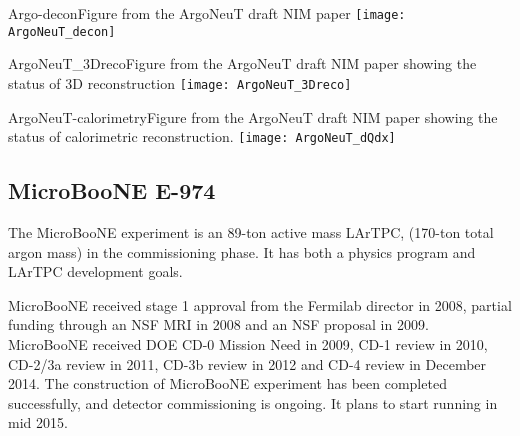\begin{cdrfigure}{Argo-decon}{Figure from the ArgoNeuT draft NIM paper}
\texttt{[image: ArgoNeuT\_decon]}
\end{cdrfigure} %

\begin{cdrfigure}{ArgoNeuT_3Dreco}{Figure from the ArgoNeuT draft NIM paper showing the status of 3D reconstruction}
\texttt{[image: ArgoNeuT\_3Dreco]}
\end{cdrfigure}%

\begin{cdrfigure}{ArgoNeuT-calorimetry}{Figure from the ArgoNeuT draft NIM paper showing the status of calorimetric reconstruction.}
\texttt{[image: ArgoNeuT\_dQdx]}
\end{cdrfigure}%

\subsection {MicroBooNE E-974}

The MicroBooNE experiment is an 89-ton active mass LArTPC, (170-ton total  argon mass) in the commissioning phase.  It has both a physics program and LArTPC development goals.  

MicroBooNE received stage 1 approval from the Fermilab director in 2008, partial funding through an NSF MRI in 2008 and an NSF proposal in 2009.  MicroBooNE received DOE CD-0 Mission Need in 2009, CD-1 review in 2010, CD-2/3a review in 2011, CD-3b review in 2012 and CD-4 review in December 2014. The construction of MicroBooNE experiment has been completed successfully, and detector commissioning is ongoing. It plans to start running in mid 2015. 

